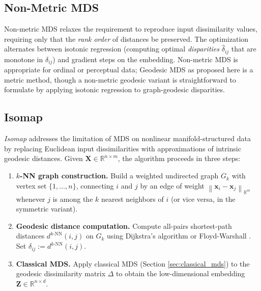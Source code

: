 \documentclass[11pt]{article}
\theoremstyle{definition}
\newcommand{\R}{\mathbb{R}}
\newcommand{\bx}{\mathbf{x}}
\newcommand{\bX}{\mathbf{X}}
\newcommand{\bZ}{\mathbf{Z}}
\newcommand{\norm}[1]{\left\|#1\right\|}
\newcommand{\dknn}{d^{k\text{-NN}}}
\newcommand{\Gk}{G_k}
\begin{document}
\subsection{Non-Metric MDS}
\label{sec:nonmetric_mds}

Non-metric MDS \citep{kruskal1964nonmetric, shepard1962analysis} relaxes
the requirement to reproduce input dissimilarity values, requiring only
that the \emph{rank order} of distances be preserved.  The optimization
alternates between isotonic regression (computing optimal
\emph{disparities} $\hat\delta_{ij}$ that are monotone in $\delta_{ij}$)
and gradient steps on the embedding.  Non-metric MDS is appropriate for
ordinal or perceptual data; Geodesic MDS as proposed here is a metric
method, though a non-metric geodesic variant is straightforward to
formulate by applying isotonic regression to graph-geodesic disparities.

\subsection{Isomap}
\label{sec:isomap}

\emph{Isomap} \citep{tenenbaum2000global} addresses the limitation of MDS
on nonlinear manifold-structured data by replacing Euclidean input
dissimilarities with approximations of intrinsic geodesic distances.
Given $\bX \in \R^{n \times m}$, the algorithm proceeds in three steps:

\begin{enumerate}
  \item \textbf{$k$-NN graph construction.}  Build a weighted undirected
        graph $\Gk$ with vertex set $\{1, \ldots, n\}$, connecting $i$ and $j$
        by an edge of weight $\norm{\bx_i - \bx_j}_{\R^m}$ whenever $j$ is
        among the $k$ nearest neighbors of $i$ (or vice versa, in the symmetric
        variant).

  \item \textbf{Geodesic distance computation.}  Compute all-pairs
        shortest-path distances $\dknn(i,j)$ on $\Gk$ using Dijkstra's
        algorithm \citep{dijkstra1959note} or Floyd-Warshall
        \citep{floyd1962algorithm}.  Set $\delta_{ij} := \dknn(i,j)$.

  \item \textbf{Classical MDS.}  Apply classical MDS (Section
        \ref{sec:classical_mds}) to the geodesic dissimilarity matrix $\Delta$
        to obtain the low-dimensional embedding $\bZ \in \R^{n \times d}$.
\end{enumerate}
\end{document}
